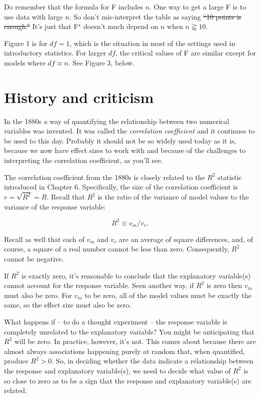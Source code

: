 \documentclass[]{tufte-book}
\begin{document}
Do remember that the formula for F includes \(n\). One way to get a large F is to use data with large \(n\). So don't mis-interpret the table as saying \sout{``10 points is enough.''} It's just that F\(^\star\) doesn't much depend on \(n\) when \(n \gtrapprox 10\).

Figure 1 is for \(df = 1\), which is the situation in most of the settings used in introductory statistics. For larger \(df\), the critical values of F are similar except for models where \(df \approx n\). See Figure 3, below.

\hypertarget{history-and-criticism}{%
\section{History and criticism}\label{history-and-criticism}}

In the 1880s a way of quantifying the relationship between two numerical variables was invented. It was called the \emph{correlation coefficient} and it continues to be used to this day. Probably it should not be so widely used today as it is, because we now have effect sizes to work with and because of the challenges to interpreting the correlation coefficient, as you'll see.

The correlation coefficient from the 1880s is closely related to the \(R^2\) statistic introduced in Chapter 6. Specifically, the size of the correlation coefficient is \(r = \sqrt{R^2} = R\). Recall that \(R^2\) is the ratio of the variance of model values to the variance of the response variable:

\[R^2 \equiv v_m / v_r.\]

Recall as well that each of \(v_m\) and \(v_r\) are an average of square differences, and, of course, a square of a real number cannot be less than zero. Consequently, \(R^2\) cannot be negative.

If \(R^2\) is exactly zero, it's reasonable to conclude that the explanatory variable(s) cannot account for the response variable. Seen another way, if \(R^2\) is zero then \(v_m\) must also be zero. For \(v_m\) to be zero, all of the model values must be exactly the same, so the effect size must also be zero.

What happens if -- to do a thought experiment -- the response variable is completely unrelated to the explanatory variable? You might be anticipating that \(R^2\) will be zero. In practice, however, it's not. This comes about because there are almost always associations happening purely at random that, when quantified, produce \(R^2 > 0\). So, in deciding whether the data indicate a relationship between the response and explanatory variable(s), we need to decide what value of \(R^2\) is so close to zero as to be a sign that the response and explanatory variable(s) are related.
\end{document}
